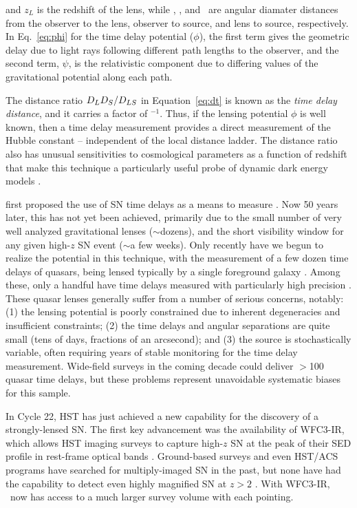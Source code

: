 \noindent and $z_L$ is the redshift of the lens, while \Dl, \Ds, 
and \Dls\ are angular diamater distances from the observer to the
lens, observer to source, and lens to source, respectively.  In
Eq.~\ref{eq:phi} for the time delay potential  ($\phi$), the first
term gives the geometric delay due to light rays following different
path lengths to the observer, and the second term, $\psi$, is the
relativistic component due to differing values of the gravitational
potential along each path.

The distance ratio $D_LD_S/D_{LS}$ in Equation~\ref{eq:dt} is known as
the {\em time delay distance}, and it carries a factor
of \Ho$^{-1}$. Thus, if the lensing potential $\phi$ is well known,
then a time delay measurement provides a direct measurement of the
Hubble constant -- independent of the local distance ladder.  The
distance ratio also has unusual sensitivities to cosmological
parameters as a function of redshift that make this technique a
particularly useful probe of dynamic dark energy
models \citep{Linder:2011}.

\citet{Refsdal:1964} first proposed the use of SN time delays as 
a means to measure \Ho.  Now 50 years later, this has not yet been
achieved, primarily due to the small number of very well analyzed
gravitational lenses ($\sim$dozens), and the short visibility window
for any given high-$z$ SN event ($\sim$a few weeks).  Only recently
have we begun to realize the potential in this technique, with the
measurement of a few dozen time delays of quasars, being lensed
typically by a single foreground galaxy \citep{Jackson:2007}. Among
these, only a handful have time delays measured with particularly high
precision \citep[e.g.][]{Suyu:2010,Suyu:2013}.  These quasar lenses
generally suffer from a number of serious concerns, notably: (1) the
lensing potential is poorly constrained due to inherent degeneracies
and insufficient constraints; (2) the time delays and angular
separations are quite small (tens of days, fractions of an arcsecond);
and (3) the source is stochastically variable, often requiring years of
stable monitoring for the time delay measurement.  Wide-field surveys
in the coming decade could deliver $>$100 quasar time delays, but
these problems represent unavoidable systematic biases for this
sample.

\medskip
{}
 
In Cycle 22, HST has just achieved a new capability for the discovery
of a strongly-lensed SN. The first key advancement was the
availability of WFC3-IR, which allows HST imaging surveys to capture
high-$z$ SN at the peak of their SED profile in rest-frame optical
bands \citep{Rodney:2012,Jones:2013}.  Ground-based surveys and even
HST/ACS programs have searched for multiply-imaged SN in the past, but
none have had the capability to detect even highly magnified SN at
$z>2$ \citep[e.g.][]{Dawson:2009,Sharon:2010,Sand:2011}.  With
WFC3-IR, \Hubble\ now has access to a much larger survey volume with
each pointing.

